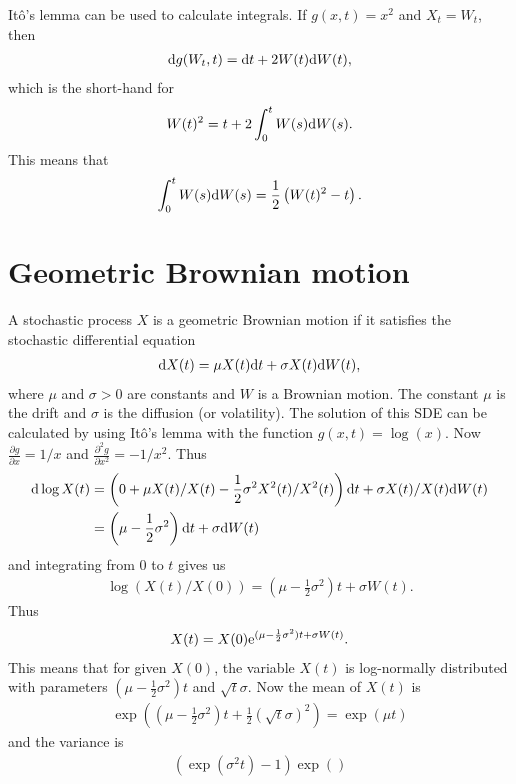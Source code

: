 It\^{o}'s lemma can be used to calculate integrals. If $g(x,t) = x^2$ and $X_t = W_t$, then 
  \begin{align}
    \mathrm{d} g(W_t,t) = \mathrm{d} t + 2 W(t) \mathrm{d} W(t),
  \end{align}
which is the short-hand for
  \begin{align}
    W(t)^2 = t + 2 \int_0^t W(s) \mathrm{d} W(s) .
  \end{align}
This means that 
  \begin{align}
    \int_0^t W(s) \mathrm{d} W(s) = \frac{1}{2} \left( W(t)^2 - t \right).
  \end{align}
  
\section{Geometric Brownian motion}

A stochastic process $X$ is a geometric Brownian motion if it satisfies the stochastic differential equation
  \begin{align}
    \mathrm{d} X(t) = \mu X(t) \mathrm{d} t + \sigma X(t) \mathrm{d} W(t),
  \end{align}
where $\mu$ and $\sigma > 0$ are constants and $W$ is a Brownian motion. The constant $\mu$ is the drift and $\sigma$ is the diffusion (or volatility). The solution of this SDE can be calculated by using It\^{o}'s lemma with the function $g(x, t) = \log(x)$. Now $\frac{\partial g}{\partial x} = 1/x$ and $\frac{\partial^2 g}{\partial x^2} = -1/x^2$. Thus
   \begin{align}
    \mathrm{d} \log X(t) &= \left( 0+ \mu X(t) / X(t) - \frac{1}{2} \sigma^2 X^2 (t) / X^2 (t) \right) \mathrm{d} t + \sigma X(t) / X(t) \mathrm{d} W(t) \\
      &= \left( \mu  - \frac{1}{2} \sigma^2 \right) \mathrm{d} t + \sigma \mathrm{d} W(t)
  \end{align}
and integrating from $0$ to $t$ gives us
  \begin{align}
    \log (X(t) / X(0) ) = \left( \mu  - \frac{1}{2} \sigma^2 \right) t + \sigma W(t) . 
  \end{align}
Thus
  \begin{align}
    X(t) = X(0) \mathrm{e}^{ (\mu  - \frac{1}{2} \sigma^2 ) t + \sigma W(t) } .
  \end{align}
This means that for given $X(0)$, the variable $X(t)$ is log-normally distributed with parameters $( \mu  - \frac{1}{2} \sigma^2 ) t$ and $\sqrt{t}\sigma$. Now the mean of $X(t)$ is
  \begin{align}
    \exp \left( ( \mu  - \frac{1}{2} \sigma^2 ) t + \frac{1}{2} ( \sqrt{t} \sigma )^2 \right) = \exp \left( \mu t \right)
  \end{align}
and the variance is
  \begin{align}
    ( \exp ( \sigma^2 t ) - 1 ) \exp ( )
  \end{align}
  
